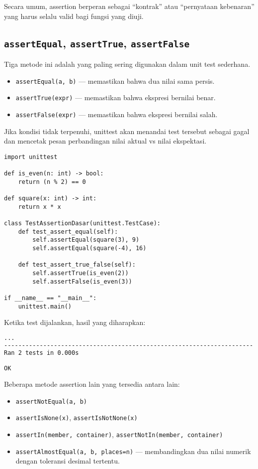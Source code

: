 Secara umum, assertion berperan sebagai “kontrak” atau “pernyataan kebenaran” yang harus selalu valid bagi fungsi yang diuji.

\subsection{\texttt{assertEqual}, \texttt{assertTrue}, \texttt{assertFalse}}

Tiga metode ini adalah yang paling sering digunakan dalam unit test sederhana.

\begin{itemize}
    \item \texttt{assertEqual(a, b)} — memastikan bahwa dua nilai sama persis.
    \item \texttt{assertTrue(expr)} — memastikan bahwa ekspresi bernilai benar.
    \item \texttt{assertFalse(expr)} — memastikan bahwa ekspresi bernilai salah.
\end{itemize}

Jika kondisi tidak terpenuhi, unittest akan menandai test tersebut sebagai gagal dan mencetak pesan perbandingan nilai aktual vs nilai ekspektasi.

\begin{lstlisting}[style=PythonStyle, caption={Contoh penggunaan assertEqual, assertTrue, dan assertFalse}, label={lst:assert-basic}]
import unittest

def is_even(n: int) -> bool:
    return (n % 2) == 0

def square(x: int) -> int:
    return x * x

class TestAssertionDasar(unittest.TestCase):
    def test_assert_equal(self):
        self.assertEqual(square(3), 9)
        self.assertEqual(square(-4), 16)

    def test_assert_true_false(self):
        self.assertTrue(is_even(2))
        self.assertFalse(is_even(3))

if __name__ == "__main__":
    unittest.main()
\end{lstlisting}

Ketika test dijalankan, hasil yang diharapkan:

\begin{lstlisting}[language=bash]
...
----------------------------------------------------------------------
Ran 2 tests in 0.000s

OK
\end{lstlisting}

Beberapa metode assertion lain yang tersedia antara lain:
\begin{itemize}
    \item \texttt{assertNotEqual(a, b)}
    \item \texttt{assertIsNone(x)}, \texttt{assertIsNotNone(x)}
    \item \texttt{assertIn(member, container)}, \texttt{assertNotIn(member, container)}
    \item \texttt{assertAlmostEqual(a, b, places=n)} — membandingkan dua nilai numerik dengan toleransi desimal tertentu.
\end{itemize}

